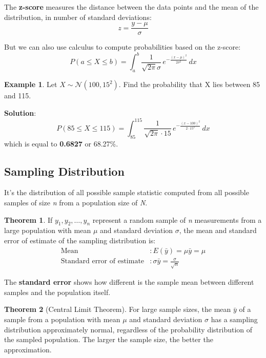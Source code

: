 \documentclass[12pt]{book}
\theoremstyle{definition}
\newtheorem{exmp}{Example}[section]
\newtheorem{theorem}{Theorem}[section]
\begin{document}
The \textbf{z-score} measures the distance between the data points and the mean of the distribution, in number of standard deviations:
\begin{equation}
    z = \frac{y - \mu}{\sigma}
\end{equation}

But we can also use calculus to compute probabilities based on the z-score:
\begin{equation}
    P(a \leq X \leq b) = \int_{a}^{b} \frac{1}{\sqrt{2 \pi} \sigma} \, e^{-\frac{(x - \mu)^2}{2 \sigma^2}} \, dx
\end{equation}

\begin{exmp}
    Let $X \sim \mathcal{N}(100, 15^2)$. Find the probability that X lies between 85 and 115.

    \textbf{Solution}: \begin{equation}
        P(85 \leq X \leq 115) = \int_{85}^{115} \frac{1}{\sqrt{2 \pi} \cdot 15} \, e^{-\frac{(x - 100)^2}{2 \cdot 15^2}} \, dx
    \end{equation}
    which is equal to \textbf{0.6827} or 68.27\%.
\end{exmp}

\subsection{Sampling Distribution}
It's the distribution of all possible sample statistic computed from all possible samples of size \textit{n} from a population size of \textit{N}.

\begin{theorem}
    If $y_1, y_2, \dots, y_n$ represent a random sample of \textit{n} measurements from a large population with mean $\mu$ and standard deviation $\sigma$, the mean and standard error of estimate of the sampling distribution is:
    \begin{align*}
        \text{Mean }&: E(\bar{y}) = \mu \bar{y} = \mu \\
        \text{Standard error of estimate} &: \sigma \bar{y} = \frac{\sigma}{\sqrt{n}}
    \end{align*}
\end{theorem}

The \textbf{standard error} shows how different is the sample mean between different samples and the population itself.

\begin{theorem} [Central Limit Theorem]
    For large sample sizes, the mean $\bar{y}$ of a sample from a population with mean $\mu$ and standard deviation $\sigma$ has a sampling distribution approximately normal, regardless of the probability distribution of the sampled population. The larger the sample size, the better the approximation.
\end{theorem}
\end{document}
